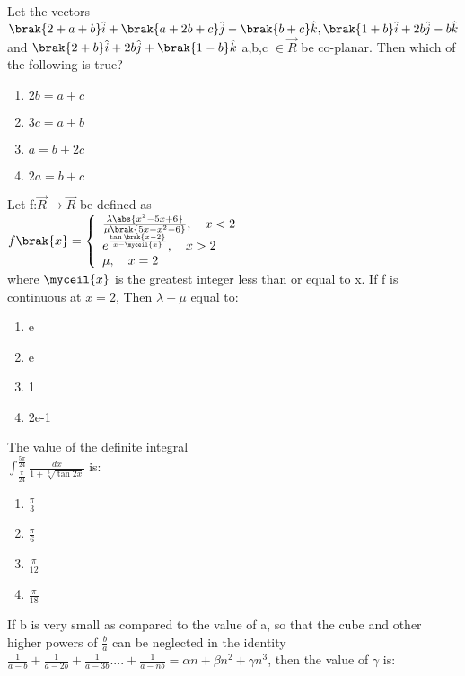\item Let the vectors $\brak{2+a+b}\hat{i}+\brak{a+2b+c}\hat{j}-\brak{b+c}\hat{k},\brak{1+b}\hat{i}+2b\hat{j}-b\hat{k}$ and $\brak{2+b}\hat{i}+2b\hat{j}+\brak{1-b}\hat{k}$ a,b,c $\in \vec{R}$ be co-planar. Then which of the following is true? \hfill{}
\begin{enumerate}
    \item $2b=a+c$
    \item $3c=a+b$
    \item $a=b+2c$
    \item $2a=b+c$
\end{enumerate}
\item Let f:$\vec{R}\rightarrow\vec{R}$ be defined as \\
$f\brak{x}=\left\{ \begin{array}{ll} \frac{\lambda\abs{x^2-5x+6}}{\mu\brak{5x-x^2-6}}, \quad x < 2 \\ e^{\frac{\tan\brak{x-2}}{x-\myceil{x}}}, \quad x>2 \\ \mu, \quad x=2 \end{array} \right. $\\
where $\myceil{x}$ is the greatest integer less than or equal to x. If f is continuous at $x=2$, Then $\lambda + \mu$ equal to: \hfill{}
\begin{enumerate}
    \item e
    \item e
    \item 1
    \item 2e-1
\end{enumerate}
\item The value of the definite integral\\
$\int_{\frac{\pi}{24}}^{\frac{5\pi}{24}} \frac{dx}{1+\sqrt[3]{\tan2x}}$ is: \hfill{}
\begin{enumerate}
    \item $\frac{\pi}{3}$
    \item $\frac{\pi}{6}$
    \item $\frac{\pi}{12}$
    \item $\frac{\pi}{18}$
\end{enumerate}
\item If b is very small as compared to the value of a, so that the cube and other higher powers of $\frac{b}{a}$ can be neglected in the identity\\
$\frac{1}{a-b}+\frac{1}{a-2b}+\frac{1}{a-3b}....+\frac{1}{a-nb}=\alpha n+\beta n^2+\gamma n^3$, then the value of $\gamma$ is: \hfill{}
